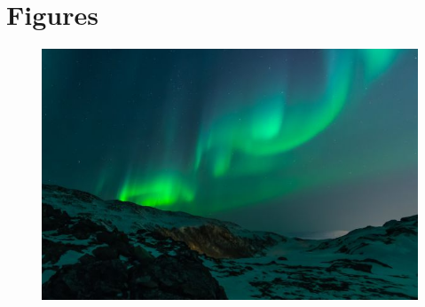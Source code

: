 \hypertarget{figure}{%
\section{Figures}\label{sec:figures}}

\begin{figure}
    \caption[Short caption text for LoF]{\blindtext}
    \label{fig:fig1}
    \centering
    \includegraphics[width=\textwidth]{figures/img_lights.jpg}
\end{figure}